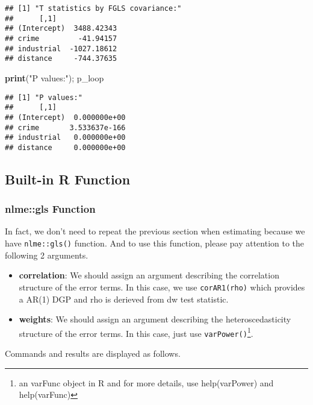 \documentclass[
  12pt,
]{article}
\newenvironment{Shaded}{\begin{snugshade}}{\end{snugshade}}
\newcommand{\KeywordTok}[1]{\textcolor[rgb]{0.13,0.29,0.53}{\textbf{#1}}}
\newcommand{\NormalTok}[1]{#1}
\newcommand{\StringTok}[1]{\textcolor[rgb]{0.31,0.60,0.02}{#1}}
\providecommand{\tightlist}{%
  \setlength{\itemsep}{0pt}\setlength{\parskip}{0pt}}
\begin{document}
\begin{Verbatim}
## [1] "T statistics by FGLS covariance:"
##      [,1]
## (Intercept)  3488.42343
## crime         -41.94157
## industrial  -1027.18612
## distance     -744.37635
\end{Verbatim}

\begin{Shaded}
\begin{Highlighting}[]
\KeywordTok{print}\NormalTok{(}\StringTok{"P values:"}\NormalTok{); p\_loop}
\end{Highlighting}
\end{Shaded}

\begin{Verbatim}
## [1] "P values:"
##      [,1]
## (Intercept)  0.000000e+00
## crime       3.533637e-166
## industrial   0.000000e+00
## distance     0.000000e+00
\end{Verbatim}

\hypertarget{built-in-r-function}{%
\subsection{Built-in R Function}\label{built-in-r-function}}

\hypertarget{nlmegls-function}{%
\subsubsection{nlme::gls Function}\label{nlmegls-function}}

In fact, we don't need to repeat the previous section when estimating because we have \texttt{nlme::gls()} function. And to use this function, please pay attention to the following 2 arguments.

\begin{itemize}
\tightlist
\item
  \textbf{correlation}: We should assign an argument describing the correlation structure of the error terms. In this case, we use \texttt{corAR1(rho)} which provides a AR(1) DGP and rho is derieved from dw test statistic.
\item
  \textbf{weights}: We should assign an argument describing the heteroscedasticity structure of the error terms. In this case, just use \texttt{varPower()}\footnote{an varFunc object in R and for more details, use help(varPower) and help(varFunc) }.
\end{itemize}

Commands and results are displayed as follows.
\end{document}
